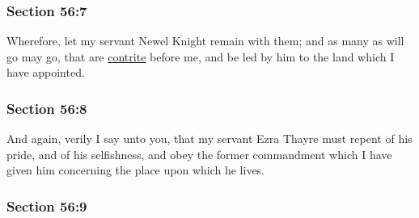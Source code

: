 
	\subsubsection{Section 56:7} %
		\label{DC56-7}

		Wherefore, let my servant Newel Knight remain with them; and as many as will go may go, that are \hyperref[CONTRITE]{contrite} before me, and be led by him to the land which I have appointed.


	\subsubsection{Section 56:8} %
		\label{DC56-8}

		And again, verily I say unto you, that my servant Ezra Thayre must repent of his pride, and of his selfishness, and obey the former commandment which I have given him concerning the place upon which he lives.


	\subsubsection{Section 56:9} %
		\label{DC56-9}

